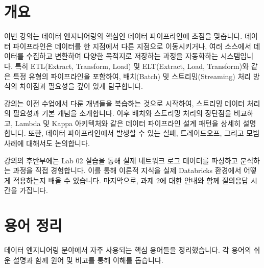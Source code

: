 \documentclass[11pt,a4paper]{article}
\theoremstyle{definition}
\begin{document}
\section{개요}

이번 강의는 데이터 엔지니어링의 핵심인 데이터 파이프라인에 초점을 맞춥니다.
데이터 파이프라인은 데이터를 한 지점에서 다른 지점으로 이동시키거나,
여러 소스에서 데이터를 수집하고 변환하여 다양한 목적지로 저장하는 과정을 자동화하는 시스템입니다.
특히 ETL(Extract, Transform, Load) 및 ELT(Extract, Load, Transform)와 같은 특정 유형의 파이프라인을 포함하여,
배치(Batch) 및 스트리밍(Streaming) 처리 방식의 차이점과 필요성을 깊이 있게 탐구합니다.

강의는 이전 수업에서 다룬 개념들을 복습하는 것으로 시작하여,
스트리밍 데이터 처리의 필요성과 기본 개념을 소개합니다.
이후 배치와 스트리밍 처리의 장단점을 비교하고,
Lambda 및 Kappa 아키텍처와 같은 데이터 파이프라인 설계 패턴을 상세히 설명합니다.
또한, 데이터 파이프라인에서 발생할 수 있는 실패, 트레이드오프, 그리고 모범 사례에 대해서도 논의합니다.

강의의 후반부에는 Lab 02 실습을 통해 실제 네트워크 로그 데이터를 파싱하고 분석하는 과정을 직접 경험합니다.
이를 통해 이론적 지식을 실제 Databricks 환경에서 어떻게 적용하는지 배울 수 있습니다.
마지막으로, 과제 2에 대한 안내와 함께 질의응답 시간을 가집니다.

\newpage
\section{용어 정리}

데이터 엔지니어링 분야에서 자주 사용되는 핵심 용어들을 정리했습니다.
각 용어의 쉬운 설명과 함께 원어 및 비고를 통해 이해를 돕습니다.
\end{document}
